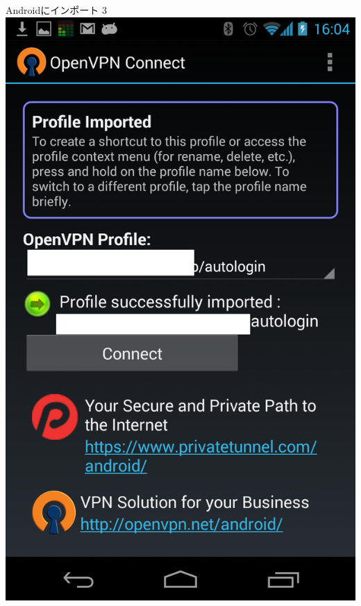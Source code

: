 \begin{frame}{Androidにインポート 3}
\includegraphics[height=0.9\vsize,bb=0 0 768 1280]{image201308/Screenshot_2013-08-17-16-04-54.png}

\end{frame}
